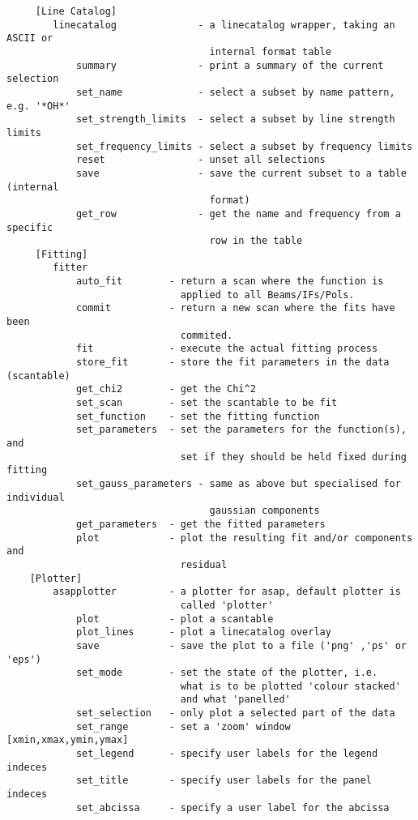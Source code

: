 \documentclass[11pt]{article}
\begin{document}
\begin{verbatim}
     [Line Catalog]
        linecatalog              - a linecatalog wrapper, taking an ASCII or
                                   internal format table
            summary              - print a summary of the current selection
            set_name             - select a subset by name pattern, e.g. '*OH*'
            set_strength_limits  - select a subset by line strength limits
            set_frequency_limits - select a subset by frequency limits
            reset                - unset all selections
            save                 - save the current subset to a table (internal
                                   format)
            get_row              - get the name and frequency from a specific
                                   row in the table
     [Fitting]
        fitter
            auto_fit        - return a scan where the function is
                              applied to all Beams/IFs/Pols.
            commit          - return a new scan where the fits have been
                              commited.
            fit             - execute the actual fitting process
            store_fit       - store the fit parameters in the data (scantable)
            get_chi2        - get the Chi^2
            set_scan        - set the scantable to be fit
            set_function    - set the fitting function
            set_parameters  - set the parameters for the function(s), and
                              set if they should be held fixed during fitting
            set_gauss_parameters - same as above but specialised for individual
                                   gaussian components
            get_parameters  - get the fitted parameters
            plot            - plot the resulting fit and/or components and
                              residual
    [Plotter]
        asapplotter         - a plotter for asap, default plotter is
                              called 'plotter'
            plot            - plot a scantable
            plot_lines      - plot a linecatalog overlay
            save            - save the plot to a file ('png' ,'ps' or 'eps')
            set_mode        - set the state of the plotter, i.e.
                              what is to be plotted 'colour stacked'
                              and what 'panelled'
            set_selection   - only plot a selected part of the data
            set_range       - set a 'zoom' window [xmin,xmax,ymin,ymax]
            set_legend      - specify user labels for the legend indeces
            set_title       - specify user labels for the panel indeces
            set_abcissa     - specify a user label for the abcissa

\end{verbatim}
\end{document}

